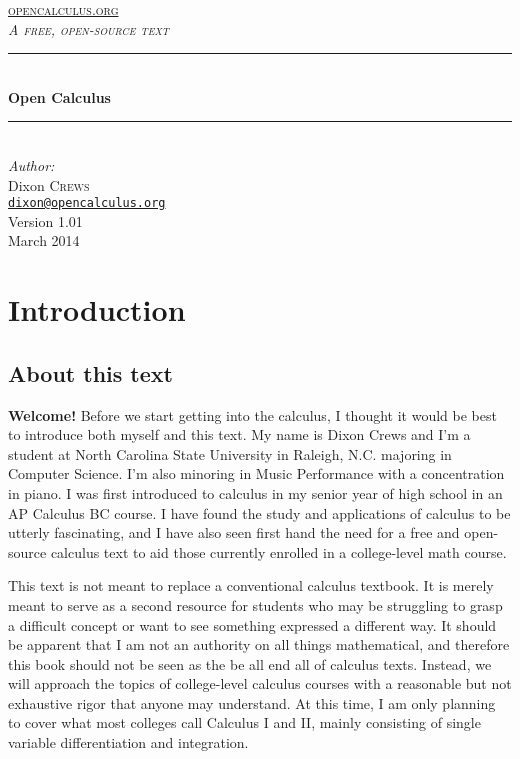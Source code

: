 \documentclass[oneside]{article}
\begin{document}
\begin{titlepage}

\newcommand{\HRule}{\rule{\linewidth}{0.5mm}} 

\center

\textsc{\large \href{http://opencalculus.org}{opencalculus.org}}\\[1.5cm] 
\textsc{\Large \textit{A free, open-source text}}\\[0.5cm] 

\HRule \\[0.4cm]
{ \huge \bfseries Open Calculus}\\[0.4cm]
\HRule \\[1.5cm]

\Large \emph{Author:}\\
Dixon \textsc{Crews}\\[0.5cm]
\small \texttt{\href{mailto:dixon@opencalculus.org}{dixon@opencalculus.org}} \\ [3.5cm]

{\large Version 1.01}\\[1cm]
{\large March 2014}\\[3cm]

\vfill 

\end{titlepage}

\tableofcontents

\newpage

\section{Introduction}
\subsection{About this text}
\textbf{Welcome!} Before we start getting into the calculus, I thought it would be best to introduce both myself and this text. My name is Dixon Crews and I'm a student at North Carolina State University in Raleigh, N.C. majoring in Computer Science. I'm also minoring in Music Performance with a concentration in piano. I was first introduced to calculus in my senior year of high school in an AP Calculus BC course. I have found the study and applications of calculus to be utterly fascinating, and I have also seen first hand the need for a free and open-source calculus text to aid those currently enrolled in a college-level math course.

This text is not meant to replace a conventional calculus textbook. It is merely meant to serve as a second resource for students who may be struggling to grasp a difficult concept or want to see something expressed a different way. It should be apparent that I am not an authority on all things mathematical, and therefore this book should not be seen as the be all end all of calculus texts. Instead, we will approach the topics of college-level calculus courses with a reasonable but not exhaustive rigor that anyone may understand. At this time, I am only planning to cover what most colleges call Calculus I and II, mainly consisting of single variable differentiation and integration.
\end{document}
